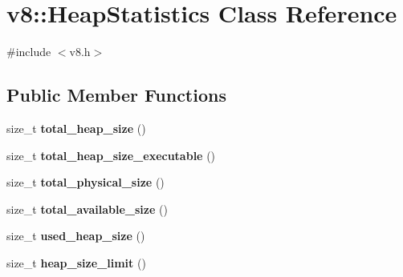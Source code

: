 \hypertarget{classv8_1_1_heap_statistics}{}\section{v8\+:\+:Heap\+Statistics Class Reference}
\label{classv8_1_1_heap_statistics}


{\ttfamily \#include $<$v8.\+h$>$}

\subsection*{Public Member Functions}
\begin{DoxyCompactItemize}
\item 
\hypertarget{classv8_1_1_heap_statistics_ac005b9c55d5818b6969c8fd61359139b}{}size\+\_\+t {\bfseries total\+\_\+heap\+\_\+size} ()\label{classv8_1_1_heap_statistics_ac005b9c55d5818b6969c8fd61359139b}

\item 
\hypertarget{classv8_1_1_heap_statistics_aa935ea51c12ec64049c06b532dbb4f8d}{}size\+\_\+t {\bfseries total\+\_\+heap\+\_\+size\+\_\+executable} ()\label{classv8_1_1_heap_statistics_aa935ea51c12ec64049c06b532dbb4f8d}

\item 
\hypertarget{classv8_1_1_heap_statistics_a084994a3a5edf15b73c9b171a911a487}{}size\+\_\+t {\bfseries total\+\_\+physical\+\_\+size} ()\label{classv8_1_1_heap_statistics_a084994a3a5edf15b73c9b171a911a487}

\item 
\hypertarget{classv8_1_1_heap_statistics_aa6df7f6e60766279cf4d8447a6d4d14d}{}size\+\_\+t {\bfseries total\+\_\+available\+\_\+size} ()\label{classv8_1_1_heap_statistics_aa6df7f6e60766279cf4d8447a6d4d14d}

\item 
\hypertarget{classv8_1_1_heap_statistics_a05ecb48bceea49d2fe430c81df02babc}{}size\+\_\+t {\bfseries used\+\_\+heap\+\_\+size} ()\label{classv8_1_1_heap_statistics_a05ecb48bceea49d2fe430c81df02babc}

\item 
\hypertarget{classv8_1_1_heap_statistics_a27e5a1ba9bc8530c6bf1cf277ce3d179}{}size\+\_\+t {\bfseries heap\+\_\+size\+\_\+limit} ()\label{classv8_1_1_heap_statistics_a27e5a1ba9bc8530c6bf1cf277ce3d179}

\end{DoxyCompactItemize}
